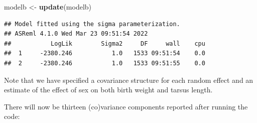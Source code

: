\documentclass[
  12pt,
]{book}
\newenvironment{Shaded}{\begin{snugshade}}{\end{snugshade}}
\newcommand{\KeywordTok}[1]{\textcolor[rgb]{0.13,0.29,0.53}{\textbf{#1}}}
\newcommand{\NormalTok}[1]{#1}
\newcommand{\OperatorTok}[1]{\textcolor[rgb]{0.81,0.36,0.00}{\textbf{#1}}}
\newcommand{\StringTok}[1]{\textcolor[rgb]{0.31,0.60,0.02}{#1}}
\begin{document}
\begin{Shaded}
\begin{Highlighting}[]
\NormalTok{modelb \textless{}{-}}\StringTok{ }\KeywordTok{update}\NormalTok{(modelb)}
\end{Highlighting}
\end{Shaded}

\begin{verbatim}
## Model fitted using the sigma parameterization.
## ASReml 4.1.0 Wed Mar 23 09:51:54 2022
##           LogLik        Sigma2     DF     wall    cpu
##  1     -2380.246           1.0   1533 09:51:54    0.0
##  2     -2380.246           1.0   1533 09:51:55    0.0
\end{verbatim}

Note that we have specified a covariance structure for each random effect and an estimate of the effect of sex on both birth weight and tarsus length.

There will now be thirteen (co)variance components reported after running the code:

\begin{Shaded}
\end{Shaded}
\end{document}
